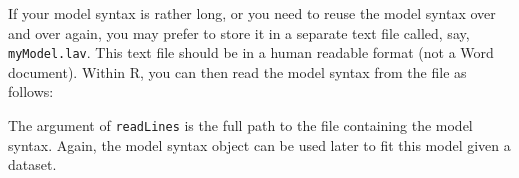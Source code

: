 If your model syntax is rather long, or you need to reuse the model
syntax over and over again, you may prefer to store it in a separate
text file called, say, \texttt{myModel.lav}. This text file should be in
a human readable format (not a Word document). Within R, you can then
read the model syntax from the file as follows:

\begin{Shaded}
\begin{Highlighting}[]
\StringTok{ }\NormalTok{(}\NormalTok{)}
\end{Highlighting}
\end{Shaded}

The argument of \texttt{readLines} is the full path to the file
containing the model syntax. Again, the model syntax object can be used
later to fit this model given a dataset.
